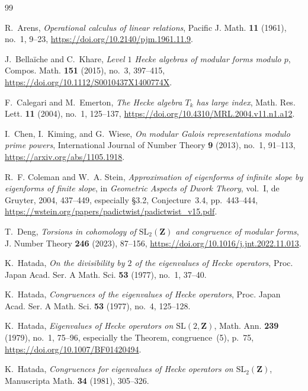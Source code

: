 \documentclass[11pt]{article}
\newcommand{\Z}{\mathbf Z}
\theoremstyle{plain}
\theoremstyle{definition}
\theoremstyle{remark}
\numberwithin{equation}{section}
\begin{document}
\clearpage
\begin{thebibliography}{99}

R.~Arens,
\emph{Operational calculus of linear relations},
Pacific J. Math. \textbf{11} (1961), no.~1, 9--23,
\url{https://doi.org/10.2140/pjm.1961.11.9}.

J.~Bella\"iche and C.~Khare,
\emph{Level \(1\) Hecke algebras of modular forms modulo \(p\)},
Compos. Math. \textbf{151} (2015), no.~3, 397--415,
\url{https://doi.org/10.1112/S0010437X1400774X}.

F.~Calegari and M.~Emerton,
\emph{The Hecke algebra \(T_k\) has large index},
Math. Res. Lett. \textbf{11} (2004), no.~1, 125--137,
\url{https://doi.org/10.4310/MRL.2004.v11.n1.a12}.

I.~Chen, I.~Kiming, and G.~Wiese,
\emph{On modular Galois representations modulo prime powers},
International Journal of Number Theory \textbf{9} (2013), no.~1,
91--113,
\url{https://arxiv.org/abs/1105.1918}.

R.~F. Coleman and W.~A. Stein,
\emph{Approximation of eigenforms of infinite slope by eigenforms of
finite slope},
in \emph{Geometric Aspects of Dwork Theory}, vol.~I,
de Gruyter, 2004, 437--449, especially \S3.2,
Conjecture~3.4, pp.~443--444,
\url{https://wstein.org/papers/padictwist/padictwist_v15.pdf}.

T.~Deng,
\emph{Torsions in cohomology of \(\mathrm{SL}_2(\mathbf Z)\)
and congruence of modular forms},
J. Number Theory \textbf{246} (2023), 87--156,
\url{https://doi.org/10.1016/j.jnt.2022.11.013}.

 K.~Hatada, \emph{On the divisibility by \(2\) of the eigenvalues of Hecke operators}, Proc. Japan Acad. Ser. A Math. Sci. \textbf{53} (1977), no.~1, 37--40. 

 K.~Hatada, \emph{Congruences of the eigenvalues of Hecke operators}, Proc. Japan Acad. Ser. A Math. Sci. \textbf{53} (1977), no.~4, 125--128.

K.~Hatada,
\emph{Eigenvalues of Hecke operators on \(\mathrm{SL}(2,\Z)\)},
Math. Ann. \textbf{239} (1979), no.~1, 75--96,
especially the Theorem, congruence~(5), p.~75,
\url{https://doi.org/10.1007/BF01420494}.

K.~Hatada,
\emph{Congruences for eigenvalues of Hecke operators on
\(\mathrm{SL}_2(\Z)\)},
Manuscripta Math. \textbf{34} (1981), 305--326.


\end{thebibliography}
\end{document}
